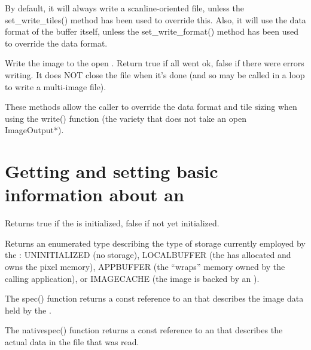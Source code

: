 By default, it will always write a scanline-oriented file, unless the
{\cf set_write_tiles()} method has been used to override this.
Also, it will use the data format of the buffer itself, unless the
{\cf set_write_format()} method has been used to override the data format.
\apiend

Write the image to the open .  Return {\cf true}
if all went ok, {\cf false} if there were errors writing.  It does NOT
close the file when it's done (and so may be called in a loop to write a
multi-image file).
\apiend

These methods allow the caller to override the data format and tile
sizing when using the {\cf write()} function (the variety that does
not take an open {\cf ImageOutput*}).
\apiend


\section{Getting and setting basic information about an \ImageBuf}

Returns {\cf true} if the \ImageBuf is initialized, {\cf false} if not
yet initialized.
\apiend

Returns an enumerated type describing the type of storage currently employed
by the \ImageBuf: {\cf UNINITIALIZED} (no storage), {\cf LOCALBUFFER} (the
\ImageBuf has allocated and owns the pixel memory), {\cf APPBUFFER} (the
\ImageBuf ``wraps'' memory owned by the calling application), or
{\cf IMAGECACHE} (the image is backed by an \ImageCache).
\apiend


The {\cf spec()} function returns a {\cf const} reference to an
\ImageSpec that describes the image data held by the \ImageBuf.  

The {\cf nativespec()} function returns a {\cf const} reference
to an \ImageSpec that describes the actual data in the file that
was read.

